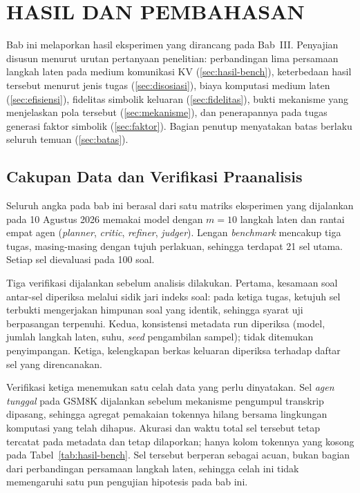\chapter{HASIL DAN PEMBAHASAN}

Bab ini melaporkan hasil eksperimen yang dirancang pada Bab~III. Penyajian
disusun menurut urutan pertanyaan penelitian: perbandingan lima persamaan
langkah laten pada medium komunikasi KV (\ref{sec:hasil-bench}), keterbedaan
hasil tersebut menurut jenis tugas (\ref{sec:disosiasi}), biaya komputasi
medium laten (\ref{sec:efisiensi}), fidelitas simbolik keluaran
(\ref{sec:fidelitas}), bukti mekanisme yang menjelaskan pola tersebut
(\ref{sec:mekanisme}), dan penerapannya pada tugas generasi faktor simbolik
(\ref{sec:faktor}). Bagian penutup menyatakan batas berlaku seluruh temuan
(\ref{sec:batas}).

\section{Cakupan Data dan Verifikasi Praanalisis}
\label{sec:cakupan}

Seluruh angka pada bab ini berasal dari satu matriks eksperimen yang dijalankan
pada 10 Agustus 2026 memakai model  dengan $m=10$ langkah
laten dan rantai empat agen (\textit{planner}, \textit{critic},
\textit{refiner}, \textit{judger}). Lengan \textit{benchmark} mencakup tiga
tugas, masing-masing dengan tujuh perlakuan, sehingga terdapat 21 sel utama.
Setiap sel dievaluasi pada 100 soal.

Tiga verifikasi dijalankan sebelum analisis dilakukan. Pertama, kesamaan soal
antar-sel diperiksa melalui sidik jari indeks soal: pada ketiga tugas, ketujuh
sel terbukti mengerjakan himpunan soal yang identik, sehingga syarat uji
berpasangan terpenuhi. Kedua, konsistensi metadata run diperiksa (model, jumlah
langkah laten, suhu, \textit{seed} pengambilan sampel); tidak ditemukan
penyimpangan. Ketiga, kelengkapan berkas keluaran diperiksa terhadap daftar sel
yang direncanakan.

Verifikasi ketiga menemukan satu celah data yang perlu dinyatakan. Sel
\textit{agen tunggal} pada GSM8K dijalankan sebelum mekanisme pengumpul
transkrip dipasang, sehingga agregat pemakaian tokennya hilang bersama
lingkungan komputasi yang telah dihapus. Akurasi dan waktu total sel tersebut
tetap tercatat pada metadata dan tetap dilaporkan; hanya kolom tokennya yang
kosong pada Tabel~\ref{tab:hasil-bench}. Sel tersebut berperan sebagai acuan,
bukan bagian dari perbandingan persamaan langkah laten, sehingga celah ini
tidak memengaruhi satu pun pengujian hipotesis pada bab ini.

